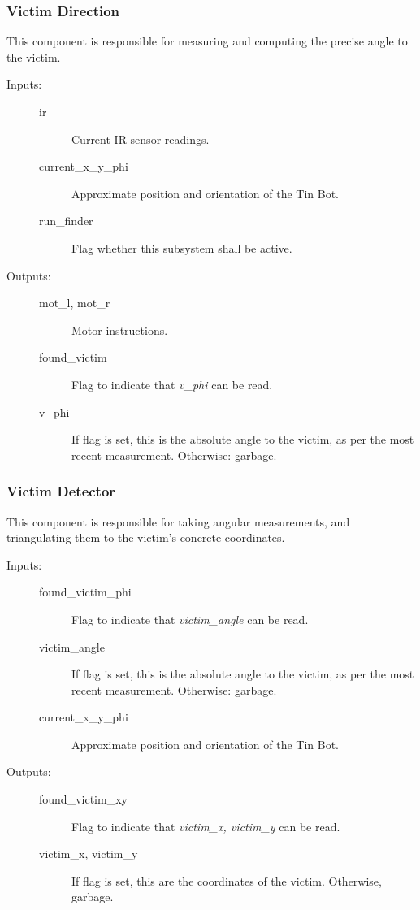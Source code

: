 \documentclass[a4paper,parskip,headheight=38pt]{scrartcl} %
\begin{document}
\subsubsection{Victim Direction}

This component is responsible for measuring and computing the precise angle to the victim.

\begin{description}
\item[Inputs:] \hfill
	\begin{description}
	\item[ir] Current IR sensor readings.
	\item[current\_x\_y\_phi] Approximate position and orientation of the Tin Bot. 
	\item[run\_finder] Flag whether this subsystem shall be active.
	\end{description}
\item[Outputs:] \hfill
	\begin{description}
	\item[mot\_l, mot\_r] Motor instructions.
	\item[found\_victim] Flag to indicate that \emph{v\_phi} can be read.
	\item[v\_phi] If flag is set, this is the absolute angle to the victim, as per the most recent measurement.  Otherwise: garbage.
	\end{description}
\end{description}

\subsubsection{Victim Detector}

This component is responsible for taking angular measurements, and
triangulating them to the victim's concrete coordinates.

\begin{description}
\item[Inputs:] \hfill
	\begin{description}
	\item[found\_victim\_phi] Flag to indicate that \emph{victim\_angle} can be read.
	\item[victim\_angle] If flag is set, this is the absolute angle to the victim, as per the most recent measurement.  Otherwise: garbage.
	\item[current\_x\_y\_phi] Approximate position and orientation of the Tin Bot. 
	\end{description}
\item[Outputs:] \hfill
	\begin{description}
	\item[found\_victim\_xy] Flag to indicate that \emph{victim\_x, victim\_y} can be read.
	\item[victim\_x, victim\_y] If flag is set, this are the coordinates of the victim.  Otherwise, garbage.
	\end{description}
\end{description}
\end{document}
